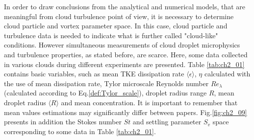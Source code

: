 \documentclass[../main.tex]{subfiles}
\begin{document}
In order to draw conclusions from the analytical and numerical models, that are meaningful from cloud turbulence point of view, it is necessary to determine cloud particle and vortex parameter space. In this case, cloud particle and turbulence data is needed to indicate what is further called "cloud-like" conditions. However simultaneous measurements of cloud droplet microphysics and turbulence properties, as stated before, are scarce. Here, some data collected in various clouds during different experiments are presented. Table \ref{tab:ch2_01} contains basic variables, such as mean TKE dissipation rate $\langle\epsilon\rangle$, $\eta$ calculated with the use of mean dissipation rate, Tylor microscale Reynolds number $Re_{\lambda}$ (calculated according to Eq.\ref{def:Tylor_scale}), droplet radius range $R$, mean droplet radius $\langle R \rangle$ and mean concentration. It is important to remember that mean values estimations may significantly differ between papers. Fig.\ref{fig:ch2_09} presents in addition the Stokes number $St$ and settling parameter $S_v$ space corresponding to some data in Table \ref{tab:ch2_01}.

\end{document}
